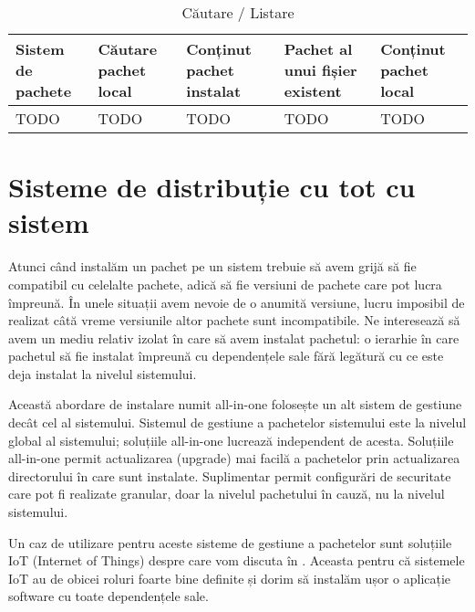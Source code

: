 \begin{table}[!htb]
  \caption{Căutare / Listare}
  \begin{center}
    \begin{tabular}{ p{} p{} p{} p{} p{} }
      \toprule
        \textbf{Sistem de pachete} &
        \textbf{Căutare pachet local} &
        \textbf{Conținut pachet instalat} &
        \textbf{Pachet al unui fișier existent} &
        \textbf{Conținut pachet local} \\
      \midrule
        TODO &
        TODO &
        TODO &
        TODO &
        TODO \\
      \bottomrule
    \end{tabular}
    \label{tab:package:config-list}
  \end{center}
\end{table}

\section{Sisteme de distribuție cu tot cu sistem}
\label{sec:package:all-in-one}

Atunci când instalăm un pachet pe un sistem trebuie să avem grijă să fie compatibil cu celelalte pachete, adică să fie versiuni de pachete care pot lucra împreună. În unele situații avem nevoie de o anumită versiune, lucru imposibil de realizat câtă vreme versiunile altor pachete sunt incompatibile. Ne interesează să avem un mediu relativ izolat în care să avem instalat pachetul: o ierarhie în care pachetul să fie instalat împreună cu dependențele sale fără legătură cu ce este deja instalat la nivelul sistemului.

Această abordare de instalare numit all-in-one folosește un alt sistem de gestiune decât cel al sistemului. Sistemul de gestiune a pachetelor sistemului este la nivelul global al sistemului; soluțiile all-in-one lucrează independent de acesta. Soluțiile all-in-one permit actualizarea (upgrade) mai facilă a pachetelor prin actualizarea directorului în care sunt instalate. Suplimentar permit configurări de securitate care pot fi realizate granular, doar la nivelul pachetului în cauză, nu la nivelul sistemului.

Un caz de utilizare pentru aceste sisteme de gestiune a pachetelor sunt soluțiile IoT (Internet of Things) despre care vom discuta în . Aceasta pentru că sistemele IoT au de obicei roluri foarte bine definite și dorim să instalăm ușor o aplicație software cu toate dependențele sale.

